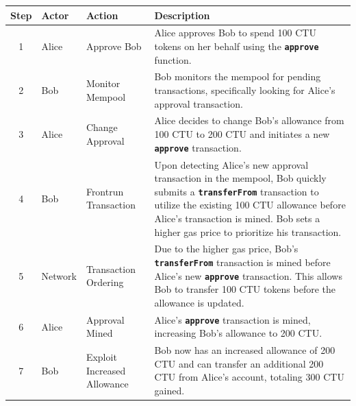\documentclass[12pt]{article}
\begin{document}
\begin{table}[H]
  \centering
  \begin{tabular}{|c|l|l|p{8.5cm}|}
      \hline
      \textbf{Step} & \textbf{Actor} & \textbf{Action} & \textbf{Description} \\
      \hline
      \scriptsize{1} & \scriptsize{Alice} & \scriptsize{Approve Bob} & \scriptsize{Alice approves Bob to spend 100 CTU tokens on her behalf using the \texttt{\textbf{approve}} function.} \\
      \hline
      \scriptsize{2} & \scriptsize{Bob} & \scriptsize{Monitor Mempool} & \scriptsize{Bob monitors the mempool for pending transactions, specifically looking for Alice's approval transaction.} \\
      \hline
      \scriptsize{3} & \scriptsize{Alice} & \scriptsize{Change Approval} & \scriptsize{Alice decides to change Bob's allowance from 100 CTU to 200 CTU and initiates a new \texttt{\textbf{approve}} transaction.} \\
      \hline
      \scriptsize{4} & \scriptsize{Bob} & \scriptsize{Frontrun Transaction} & \scriptsize{Upon detecting Alice's new approval transaction in the mempool, Bob quickly submits a \texttt{\textbf{transferFrom}} transaction to utilize the existing 100 CTU allowance before Alice's transaction is mined. Bob sets a higher gas price to prioritize his transaction.} \\
      \hline
      \scriptsize{5} & \scriptsize{Network} & \scriptsize{Transaction Ordering} & \scriptsize{Due to the higher gas price, Bob's \texttt{\textbf{transferFrom}} transaction is mined before Alice's new \texttt{\textbf{approve}} transaction. This allows Bob to transfer 100 CTU tokens before the allowance is updated.} \\
      \hline
      \scriptsize{6} & \scriptsize{Alice} & \scriptsize{Approval Mined} & \scriptsize{Alice's \texttt{\textbf{approve}} transaction is mined, increasing Bob's allowance to 200 CTU.} \\
      \hline
      \scriptsize{7} & \scriptsize{Bob} & \scriptsize{Exploit Increased Allowance} & \scriptsize{Bob now has an increased allowance of 200 CTU and can transfer an additional 200 CTU from Alice's account, totaling 300 CTU gained.} \\
      \hline
  \end{tabular}
  \label{tab:attack-scenario}
\end{table}
\end{document}
